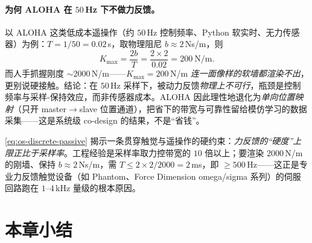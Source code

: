 \paragraph{为何 ALOHA 在 $50\,$Hz 下不做力反馈。}
以 ALOHA 这类低成本遥操作（约 $50\,$Hz 控制频率、Python 软实时、无力传感器）为例：$T=1/50=0.02\,$s，取物理阻尼 $b\approx2\,$Ns/m，则
\begin{equation}
  K_{\max}=\frac{2b}{T}=\frac{2\times2}{0.02}=200\ \text{N/m}.
  \label{eq:ts-aloha-zwidth}
\end{equation}
而人手抓握刚度 $\sim2000\,$N/m——$K_{\max}=200\,$N/m \emph{连一面像样的软墙都渲染不出}，更别说硬接触。结论：在 $50\,$Hz 采样下，被动力反馈\emph{物理上不可行}，瓶颈是控制频率与采样-保持效应，而非传感器成本。ALOHA 因此理性地退化为\emph{单向位置映射}（只开 master$\to$slave 位置通道），把省下的带宽与可靠性留给模仿学习的数据采集——这是系统级 co-design 的结果，不是“省钱”。

\begin{insight}[采样率决定力反馈质量]
\cref{eq:os-discrete-passive} 揭示一条贯穿触觉与遥操作的硬约束：\emph{力反馈的“硬度”上限正比于采样率}。工程经验是采样率取力控带宽的 $10$ 倍以上；要渲染 $2000\,$N/m 的刚墙、保持 $b\approx2\,$Ns/m，需 $T\le2\times2/2000=2\,$ms，即 $\ge500\,$Hz——这正是专业力反馈触觉设备（如 Phantom、Force Dimension omega/sigma 系列）的伺服回路跑在 $1$--$4\,$kHz 量级的根本原因。
\end{insight}

\section{本章小结}
\label{sec:ts-summary}

